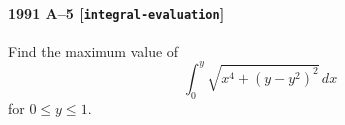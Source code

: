 \paragraph{1991 A--5 \textnormal{[\texttt{integral-evaluation}]}}
Find the maximum value of
\[
\int_0^y \sqrt{x^4 + (y-y^2)^2}\,dx
\]
for $0 \leq y \leq 1$.
